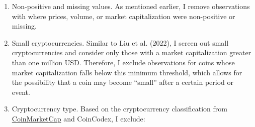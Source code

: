 \documentclass[
  11pt,
  a4paper,
  openany]{scrreprt}
\begin{document}
\begin{enumerate}
\def\labelenumi{\arabic{enumi}.}
\item
  Non-positive and missing values. As mentioned earlier, I remove
  observations with where prices, volume, or market capitalization were
  non-positive or missing.
\item
  Small cryptocurrencies. Similar to Liu et al. (2022), I screen out
  small cryptocurrencies and consider only those with a market
  capitalization greater than one million USD. Therefore, I exclude
  observations for coins whose market capitalization falls below this
  minimum threshold, which allows for the possibility that a coin may
  become ``small'' after a certain period or event.
\item
  Cryptocurrency type. Based on the cryptocurrency classification from
  \href{https://coinmarketcap.com/cryptocurrency-category/}{CoinMarketCap}
  and CoinCodex, I exclude:


\end{enumerate}
\end{document}
